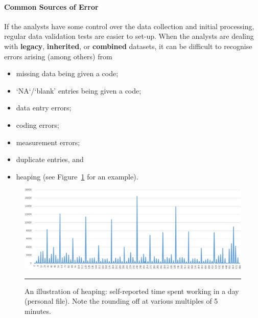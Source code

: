 \paragraph{Common Sources of Error}
If the analysts have some control over the data collection and initial processing, regular data validation tests are easier to set-up. When the analysts are dealing with \textbf{legacy}, \textbf{inherited}, or \textbf{combined} datasets, it can be difficult to recognise errors arising (among others) from \begin{itemize}[noitemsep] \item missing data being given a code; \item `NA`/`blank' entries being given a code; \item data entry errors;\item coding errors;\item measurement errors;\item duplicate entries, and \item heaping (see Figure~\ref{fig:heaping} for an example).\end{itemize} 
\begin{figure}[t]
\centering
\includegraphics[width=\textwidth]{images/DP/heaping.png}
\caption[\small An illustration of heaping]{\small An illustration of heaping: self-reported time spent working in a day (personal file). Note the rounding off at various multiples of 5 minutes.} \hrule \label{fig:heaping}
\end{figure}
\afterpage{\FloatBarrier}
